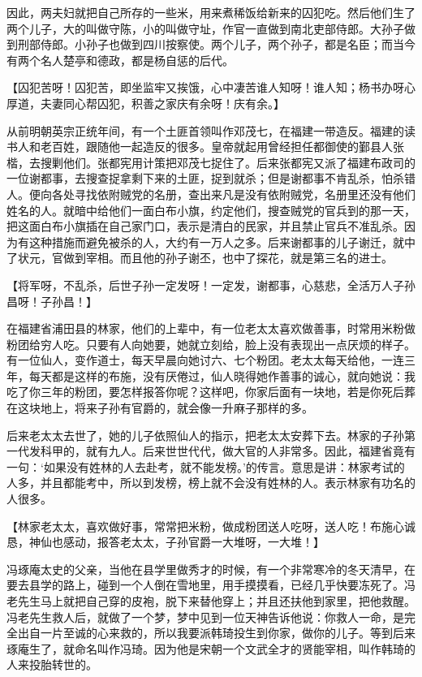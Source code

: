 \documentclass[12pt,twoside,openany]{book}
\newcommand{\kai}[1]{{\CJKfamily{kai}#1}}
\begin{document}
因此，两夫妇就把自己所存的一些米，用来煮稀饭给新来的囚犯吃。然后他们生了两个儿子，大的叫做守陈，小的叫做守址，作官一直做到南北吏部侍郎。大孙子做到刑部侍郎。小孙子也做到四川按察使。两个儿子，两个孙子，都是名臣；而当今有两个名人楚亭和德政，都是杨自惩的后代。

【\kai{囚犯苦呀！囚犯苦，即坐监牢又挨饿，心中凄苦谁人知呀！谁人知；杨书办呀心厚道，夫妻同心帮囚犯，积善之家庆有余呀！庆有余。}】

从前明朝英宗正统年间，有一个土匪首领叫作邓茂七，在福建一带造反。福建的读书人和老百姓，跟随他一起造反的很多。皇帝就起用曾经担任都御使的鄞县人张楷，去搜剿他们。张都宪用计策把邓茂七捉住了。后来张都宪又派了福建布政司的一位谢都事，去搜查捉拿剩下来的土匪，捉到就杀；但是谢都事不肯乱杀，怕杀错人。便向各处寻找依附贼党的名册，查出来凡是没有依附贼党，名册里还没有他们姓名的人。就暗中给他们一面白布小旗，约定他们，搜查贼党的官兵到的那一天，把这面白布小旗插在自己家门口，表示是清白的民家，并且禁止官兵不准乱杀。因为有这种措施而避免被杀的人，大约有一万人之多。后来谢都事的儿子谢迁，就中了状元，官做到宰相。而且他的孙子谢丕，也中了探花，就是第三名的进士。

【\kai{将军呀，不乱杀，后世子孙一定发呀！一定发，谢都事，心慈悲，全活万人子孙昌呀！子孙昌！}】

在福建省浦田县的林家，他们的上辈中，有一位老太太喜欢做善事，时常用米粉做粉团给穷人吃。只要有人向她要，她就立刻给，脸上没有表现出一点厌烦的样子。有一位仙人，变作道士，每天早晨向她讨六、七个粉团。老太太每天给他，一连三年，每天都是这样的布施，没有厌倦过，仙人晓得她作善事的诚心，就向她说：我吃了你三年的粉团，要怎样报答你呢？这样吧，你家后面有一块地，若是你死后葬在这块地上，将来子孙有官爵的，就会像一升麻子那样的多。

后来老太太去世了，她的儿子依照仙人的指示，把老太太安葬下去。林家的子孙第一代发科甲的，就有九人。后来世世代代，做大官的人非常多。因此，福建省竟有一句：‘如果没有姓林的人去赴考，就不能发榜。’的传言。意思是讲：林家考试的人多，并且都能考中，所以到发榜，榜上就不会没有姓林的人。表示林家有功名的人很多。

【\kai{林家老太太，喜欢做好事，常常把米粉，做成粉团送人吃呀，送人吃！布施心诚恳，神仙也感动，报答老太太，子孙官爵一大堆呀，一大堆！}】

冯琢庵太史的父亲，当他在县学里做秀才的时候，有一个非常寒冷的冬天清早，在要去县学的路上，碰到一个人倒在雪地里，用手摸摸看，已经几乎快要冻死了。冯老先生马上就把自己穿的皮袍，脱下来替他穿上；并且还扶他到家里，把他救醒。冯老先生救人后，就做了一个梦，梦中见到一位天神告诉他说：你救人一命，是完全出自一片至诚的心来救的，所以我要派韩琦投生到你家，做你的儿子。等到后来琢庵生了，就命名叫作冯琦。因为他是宋朝一个文武全才的贤能宰相，叫作韩琦的人来投胎转世的。
\end{document}
